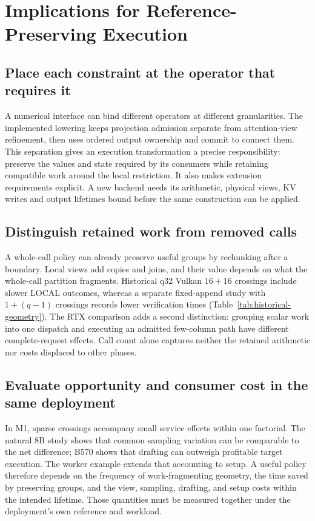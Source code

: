 \section{Implications for Reference-Preserving Execution}
\label{sec:discussion}

\subsection{Place each constraint at the operator that requires it}
A numerical interface can bind different operators at different granularities. The implemented lowering keeps projection admission separate from attention-view refinement, then uses ordered output ownership and commit to connect them. This separation gives an execution transformation a precise responsibility: preserve the values and state required by its consumers while retaining compatible work around the local restriction. It also makes extension requirements explicit. A new backend needs its arithmetic, physical views, KV writes and output lifetimes bound before the same construction can be applied.

\subsection{Distinguish retained work from removed calls}
A whole-call policy can already preserve useful groups by rechunking after a boundary. Local views add copies and joins, and their value depends on what the whole-call partition fragments. Historical q32 Vulkan $16+16$ crossings include slower LOCAL outcomes, whereas a separate fixed-append study with $1+(q-1)$ crossings records lower verification times (Table~\ref{tab:historical-geometry}). The RTX comparison adds a second distinction: grouping scalar work into one dispatch and executing an admitted few-column path have different complete-request effects. Call count alone captures neither the retained arithmetic nor costs displaced to other phases.

\subsection{Evaluate opportunity and consumer cost in the same deployment}
In M1, sparse crossings accompany small service effects within one factorial. The natural 8B study shows that common sampling variation can be comparable to the net difference; B570 shows that drafting can outweigh profitable target execution. The worker example extends that accounting to setup. A useful policy therefore depends on the frequency of work-fragmenting geometry, the time saved by preserving groups, and the view, sampling, drafting, and setup costs within the intended lifetime. Those quantities must be measured together under the deployment's own reference and workload.

